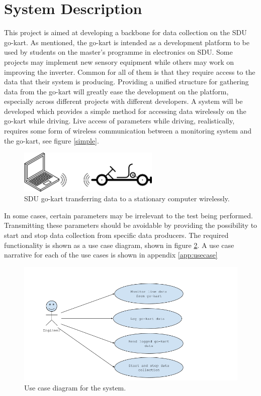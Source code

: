 \section{System Description}
\label{sec:system_description}
This project is aimed at developing a backbone for data collection on the SDU go-kart.
As mentioned, the go-kart is intended as a development platform to be used by students on the master's programme in electronics on SDU.
Some projects may implement new sensory equipment while others may work on improving the inverter.
Common for all of them is that they require access to the data that their system is producing.
Providing a unified structure for gathering data from the go-kart will greatly ease the development on the platform, especially across different projects with different developers.
A system will be developed which provides a simple method for accessing data wirelessly on the go-kart while driving.
Live access of parameters while driving, realistically, requires some form of wireless communication between a monitoring system and the go-kart, see figure \ref{simple}.

\begin{figure}[h]
 	\centering
    \includegraphics[width=0.6\textwidth]{graphics/go_kart_network_simple}
    \caption{SDU go-kart transferring data to a stationary computer wirelessly.}
    \label{fig:simple}
\end{figure}

In some cases, certain parameters may be irrelevant to the test being performed.
Transmitting these parameters should be avoidable by providing the possibility to start and stop data collection from specific data producers.
The required functionality is shown as a use case diagram, shown in figure \ref{fig:usecases}.
A use case narrative for each of the use cases is shown in appendix \ref{app:usecase}

\begin{figure}[h]
 	\centering
    \includegraphics[width=1\textwidth]{graphics/use_cases.png}
    \caption{Use case diagram for the system.}
    \label{fig:usecases}
\end{figure}

